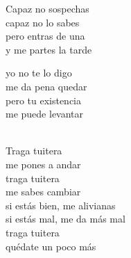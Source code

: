 \begin{lyrics}
Capaz no sospechas\\
capaz no lo sabes\\
pero entras de una\\
y me partes la tarde

yo no te lo digo\\
me da pena quedar\\
pero tu existencia\\
me puede levantar

\\
Traga tuitera\\
me pones a andar\\
traga tuitera\\
me sabes cambiar\\
si estás bien, me alivianas\\
si estás mal, me da más mal\\
traga tuitera\\
quédate un poco más
\end{lyrics}

